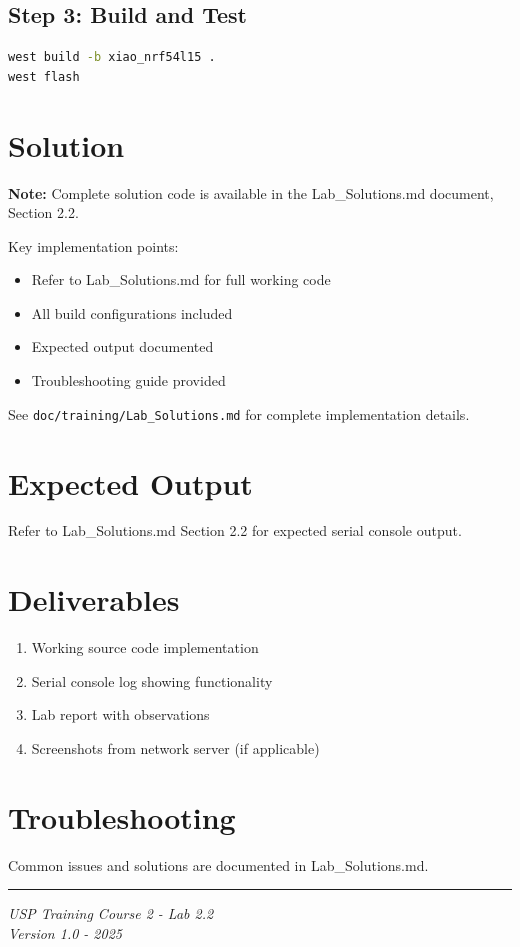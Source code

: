 \documentclass[11pt,a4paper]{article}
\begin{document}
\subsection{Step 3: Build and Test}
\begin{lstlisting}[language=bash]
west build -b xiao_nrf54l15 .
west flash
\end{lstlisting}

\section{Solution}

\begin{solutionbox}
\textbf{Note:} Complete solution code is available in the Lab\_Solutions.md document, Section 2.2.

Key implementation points:
\begin{itemize}
    \item Refer to Lab\_Solutions.md for full working code
    \item All build configurations included
    \item Expected output documented
    \item Troubleshooting guide provided
\end{itemize}

See \texttt{doc/training/Lab\_Solutions.md} for complete implementation details.
\end{solutionbox}

\section{Expected Output}

Refer to Lab\_Solutions.md Section 2.2 for expected serial console output.

\section{Deliverables}

\begin{enumerate}[itemsep=10pt]
    \item Working source code implementation
    \item Serial console log showing functionality
    \item Lab report with observations
    \item Screenshots from network server (if applicable)
\end{enumerate}

\section{Troubleshooting}

Common issues and solutions are documented in Lab\_Solutions.md.

\vfill
\noindent\rule{\textwidth}{0.4pt}
\begin{center}
\textit{USP Training Course 2 - Lab 2.2}\\
\textit{Version 1.0 - 2025}
\end{center}
\end{document}
